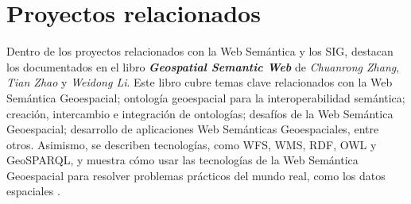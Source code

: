 




\section{Proyectos relacionados}

Dentro de los proyectos relacionados con la Web Semántica y los SIG, destacan los documentados en el libro \textit{\textbf{Geospatial Semantic Web}} de \textit{Chuanrong Zhang}, \textit{Tian Zhao} y \textit{Weidong Li}. Este libro cubre temas clave relacionados con la Web Semántica Geoespacial; ontología geoespacial para la interoperabilidad semántica; creación, intercambio e integración de ontologías; desafíos de la Web Semántica Geoespacial; desarrollo de aplicaciones Web Semánticas Geoespaciales, entre otros. Asimismo, se describen tecnologías, como WFS, WMS, RDF, OWL y GeoSPARQL, y muestra cómo usar las tecnologías de la Web Semántica Geoespacial para resolver problemas prácticos del mundo real, como los datos espaciales \cite{libro-gis}. \\

